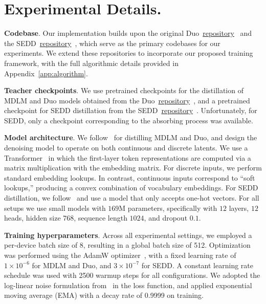 \vspace{-3mm}
\section{Experimental Details.}
\label{app: experimental details}
\vspace{-3mm}

\noindent \textbf{Codebase}. Our implementation builds upon the original Duo~\href{https://github.com/s-sahoo/duo}{repository}~\citep{sahoo2025the} and the SEDD~\href{https://github.com/louaaron/Score-Entropy-Discrete-Diffusion}{repository}~\citep{lou2024discrete}, which serve as the primary codebases for our experiments. We extend these repositories to incorporate our proposed training framework, with the full algorithmic details provided in Appendix~\ref{app:algorithm}.

\noindent \textbf{Teacher checkpoints}. We use pretrained checkpoints for the distillation of MDLM and Duo models obtained from the Duo~\href{https://github.com/s-sahoo/duo}{repository}~\citep{sahoo2025the}, and a pretrained checkpoint for SEDD distillation from the SEDD~\href{https://github.com/louaaron/Score-Entropy-Discrete-Diffusion}{repository}~\citep{lou2024discrete}. Unfortunately, for SEDD, only a checkpoint corresponding to the absorbing process was available.

\noindent \textbf{Model architecture}. We follow~\citep{sahoo2025the} for distilling MDLM and Duo, and design the denoising model to operate on both continuous and discrete latents. We use a Transformer~\citep{vaswani2017attention} in which the first-layer token representations are computed via a matrix multiplication with the embedding matrix. For discrete inputs, we perform standard embedding lookups. In contrast, continuous inputs correspond to “soft lookups,” producing a convex combination of vocabulary embeddings. For SEDD distillation, we follow~\citep{lou2024discrete} and use a model that only accepts one-hot vectors. For all setups we use small models with $169$M parameters, specifically with $12$ layers, $12$ heads, hidden size $768$, sequence length $1024$, and dropout $0.1$.

\noindent \textbf{Training hyperparameters}.  
Across all experimental settings, we employed a per-device batch size of 8, resulting in a global batch size of 512. Optimization was performed using the AdamW optimizer~\citep{loshchilov2017decoupled}, with a fixed learning rate of $1 \times 10^{-6}$ for MDLM and Duo, and $3 \times 10^{-7}$ for SEDD. A constant learning rate schedule was used with 2500 warmup steps for all configurations. We adopted the log-linear noise formulation from~\citep{lou2024discrete} in the loss function, and applied exponential moving average (EMA) with a decay rate of 0.9999 on training.


